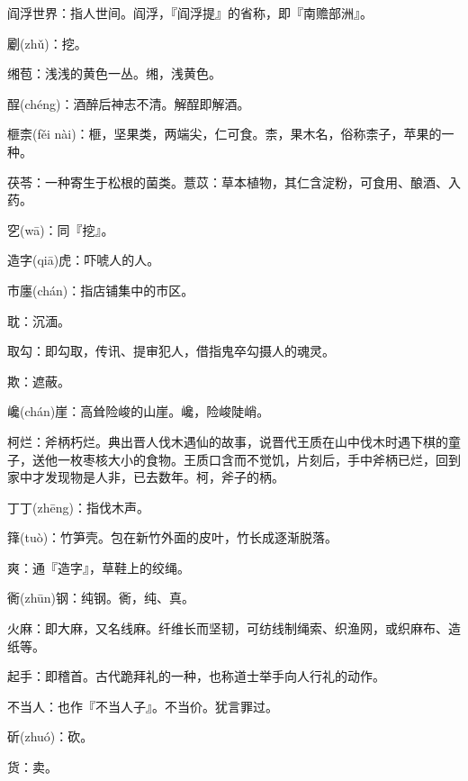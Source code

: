 \startbuffer[39]
阎浮世界：指人世间。阎浮，『阎浮提』的省称，即『南赡部洲』。
\stopbuffer


\startbuffer[40]
劚(zhǔ)：挖。
\stopbuffer


\startbuffer[41]
缃苞：浅浅的黄色一丛。缃，浅黄色。
\stopbuffer


\startbuffer[42]
酲(chéng)：酒醉后神志不清。解酲即解酒。
\stopbuffer


\startbuffer[43]
榧柰(fěi nài)：榧，坚果类，两端尖，仁可食。柰，果木名，俗称柰子，苹果的一种。
\stopbuffer


\startbuffer[44]
茯苓：一种寄生于松根的菌类。薏苡：草本植物，其仁含淀粉，可食用、酿酒、入药。
\stopbuffer


\startbuffer[45]
穵(wā)：同『挖』。
\stopbuffer


\startbuffer[46]
造字(qiā)虎：吓唬人的人。
\stopbuffer


\startbuffer[47]
市廛(chán)：指店铺集中的市区。
\stopbuffer


\startbuffer[48]
耽：沉湎。
\stopbuffer


\startbuffer[49]
取勾：即勾取，传讯、提审犯人，借指鬼卒勾摄人的魂灵。
\stopbuffer


\startbuffer[50]
欺：遮蔽。
\stopbuffer


\startbuffer[51]
巉(chán)崖：高耸险峻的山崖。巉，险峻陡峭。
\stopbuffer


\startbuffer[52]
柯烂：斧柄朽烂。典出晋人伐木遇仙的故事，说晋代王质在山中伐木时遇下棋的童子，送他一枚枣核大小的食物。王质口含而不觉饥，片刻后，手中斧柄已烂，回到家中才发现物是人非，已去数年。柯，斧子的柄。
\stopbuffer


\startbuffer[53]
丁丁(zhēng)：指伐木声。
\stopbuffer


\startbuffer[54]
箨(tuò)：竹笋壳。包在新竹外面的皮叶，竹长成逐渐脱落。
\stopbuffer


\startbuffer[55]
爽：通『造字』，草鞋上的绞绳。
\stopbuffer


\startbuffer[56]
衠(zhūn)钢：纯钢。衠，纯、真。
\stopbuffer


\startbuffer[57]
火麻：即大麻，又名线麻。纤维长而坚韧，可纺线制绳索、织渔网，或织麻布、造纸等。
\stopbuffer


\startbuffer[58]
起手：即稽首。古代跪拜礼的一种，也称道士举手向人行礼的动作。
\stopbuffer


\startbuffer[59]
不当人：也作『不当人子』。不当价。犹言罪过。
\stopbuffer


\startbuffer[60]
斫(zhuó)：砍。
\stopbuffer


\startbuffer[61]
货：卖。
\stopbuffer


